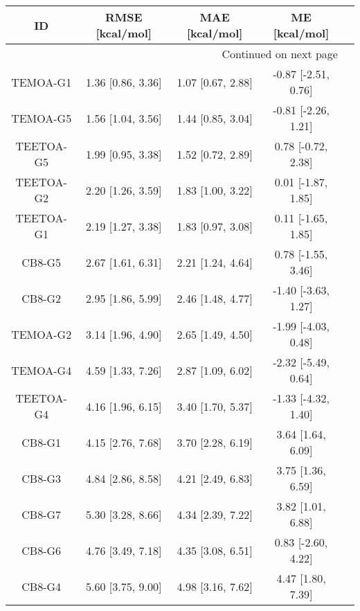 \documentclass[8pt]{article}
\begin{document}
\begin{center}
\begin{footnotesize}
\begin{longtable}{|ccccc|}
\toprule
        ID &    RMSE [kcal/mol] &     MAE [kcal/mol] &        ME [kcal/mol] \\
\midrule
\endhead
\midrule
\multicolumn{4}{r}{{Continued on next page}} \\
\midrule
\endfoot

\bottomrule
\endlastfoot
  TEMOA-G1 &  1.36 [0.86, 3.36] &  1.07 [0.67, 2.88] &  -0.87 [-2.51, 0.76] \\
  TEMOA-G5 &  1.56 [1.04, 3.56] &  1.44 [0.85, 3.04] &  -0.81 [-2.26, 1.21] \\
 TEETOA-G5 &  1.99 [0.95, 3.38] &  1.52 [0.72, 2.89] &   0.78 [-0.72, 2.38] \\
 TEETOA-G2 &  2.20 [1.26, 3.59] &  1.83 [1.00, 3.22] &   0.01 [-1.87, 1.85] \\
 TEETOA-G1 &  2.19 [1.27, 3.38] &  1.83 [0.97, 3.08] &   0.11 [-1.65, 1.85] \\
    CB8-G5 &  2.67 [1.61, 6.31] &  2.21 [1.24, 4.64] &   0.78 [-1.55, 3.46] \\
    CB8-G2 &  2.95 [1.86, 5.99] &  2.46 [1.48, 4.77] &  -1.40 [-3.63, 1.27] \\
  TEMOA-G2 &  3.14 [1.96, 4.90] &  2.65 [1.49, 4.50] &  -1.99 [-4.03, 0.48] \\
  TEMOA-G4 &  4.59 [1.33, 7.26] &  2.87 [1.09, 6.02] &  -2.32 [-5.49, 0.64] \\
 TEETOA-G4 &  4.16 [1.96, 6.15] &  3.40 [1.70, 5.37] &  -1.33 [-4.32, 1.40] \\
    CB8-G1 &  4.15 [2.76, 7.68] &  3.70 [2.28, 6.19] &    3.64 [1.64, 6.09] \\
    CB8-G3 &  4.84 [2.86, 8.58] &  4.21 [2.49, 6.83] &    3.75 [1.36, 6.59] \\
    CB8-G7 &  5.30 [3.28, 8.66] &  4.34 [2.39, 7.22] &    3.82 [1.01, 6.88] \\
    CB8-G6 &  4.76 [3.49, 7.18] &  4.35 [3.08, 6.51] &   0.83 [-2.60, 4.22] \\
    CB8-G4 &  5.60 [3.75, 9.00] &  4.98 [3.16, 7.62] &    4.47 [1.80, 7.39] \\
\end{longtable}
\end{footnotesize}
\end{center}
\end{document}
